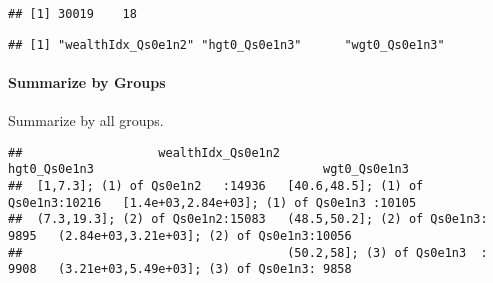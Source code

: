 \documentclass[
]{book}
\newenvironment{Shaded}{\begin{snugshade}}{\end{snugshade}}
\newcommand{\CommentTok}[1]{\textcolor[rgb]{0.56,0.35,0.01}{\textit{#1}}}
\newcommand{\ControlFlowTok}[1]{\textcolor[rgb]{0.13,0.29,0.53}{\textbf{#1}}}
\newcommand{\KeywordTok}[1]{\textcolor[rgb]{0.13,0.29,0.53}{\textbf{#1}}}
\newcommand{\NormalTok}[1]{#1}
\newcommand{\OperatorTok}[1]{\textcolor[rgb]{0.81,0.36,0.00}{\textbf{#1}}}
\newcommand{\StringTok}[1]{\textcolor[rgb]{0.31,0.60,0.02}{#1}}
\begin{document}
\begin{verbatim}
## [1] 30019    18
\end{verbatim}

\begin{Shaded}
\end{Shaded}

\begin{verbatim}
## [1] "wealthIdx_Qs0e1n2" "hgt0_Qs0e1n3"      "wgt0_Qs0e1n3"
\end{verbatim}

\hypertarget{summarize-by-groups}{%
\paragraph{Summarize by Groups}\label{summarize-by-groups}}

Summarize by all groups.

\begin{Shaded}
\end{Shaded}

\begin{verbatim}
##                   wealthIdx_Qs0e1n2                      hgt0_Qs0e1n3                                wgt0_Qs0e1n3  
##  [1,7.3]; (1) of Qs0e1n2   :14936   [40.6,48.5]; (1) of Qs0e1n3:10216   [1.4e+03,2.84e+03]; (1) of Qs0e1n3 :10105  
##  (7.3,19.3]; (2) of Qs0e1n2:15083   (48.5,50.2]; (2) of Qs0e1n3: 9895   (2.84e+03,3.21e+03]; (2) of Qs0e1n3:10056  
##                                     (50.2,58]; (3) of Qs0e1n3  : 9908   (3.21e+03,5.49e+03]; (3) of Qs0e1n3: 9858
\end{verbatim}

\begin{Shaded}
\end{Shaded}
\end{document}
